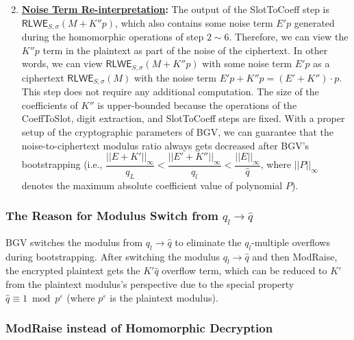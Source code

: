 \begin{enumerate}
$ $

\item \textbf{\textsf{\underline{Noise Term Re-interpretation}}:} The output of the \textsf{SlotToCoeff} step is $\textsf{RLWE}_{S, \sigma}(M + K''p)$, which also contains some noise term $E'p$ generated during the homomorphic operations of step $2 \sim 6$. Therefore, we can view the $K''p$ term in the plaintext as part of the noise of the ciphertext. In other words, we can view $\textsf{RLWE}_{S, \sigma}(M + K''p)$ with some noise term $E'p$ as a ciphertext $\textsf{RLWE}_{S, \sigma}(M)$ with the noise term $E'p + K''p = (E' + K'')\cdot p$. This step does not require any additional computation. The size of the coefficients of $K''$ is upper-bounded because the operations of the \textsf{CoeffToSlot}, digit extraction, and \textsf{SlotToCoeff} steps are fixed. With a proper setup of the cryptographic parameters of BGV, we can guarantee that the noise-to-ciphertext modulus ratio always gets decreased after BGV's bootstrapping (i.e., $\dfrac{||E + K'||_{\infty}}{q_L} < \dfrac{||E' + K''||_{\infty}}{q_l} < \dfrac{||E||_{\infty}}{\hat{q}}$, where $||P||_\infty$ denotes the maximum absolute coefficient value of polynomial $P$).

\end{enumerate}



\subsubsection{The Reason for Modulus Switch from $q_l \rightarrow \hat{q}$} 

BGV switches the modulus from $q_l \rightarrow \hat{q}$ to eliminate the $q_l$-multiple overflows during bootstrapping. After switching the modulus $q_l \rightarrow \hat{q}$ and then \textsf{ModRaise}, the encrypted plaintext gets the $K'\hat{q}$ overflow term, which can be reduced to $K'$ from the plaintext modulus's perspective due to the special property $\hat{q} \equiv 1 \bmod p^\varepsilon$ (where $p^\varepsilon$ is the plaintext modulus).


\subsubsection{\textsf{ModRaise} instead of Homomorphic Decryption} 

